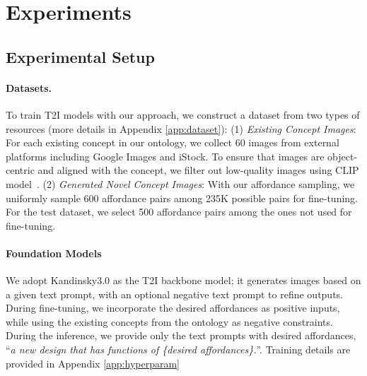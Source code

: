 \section{Experiments}
\label{sec:experiment}
% 




% 

\subsection{Experimental Setup}

\paragraph{Datasets.}
To train T2I models with our approach, we construct a dataset from two types of resources (more details in Appendix \ref{app:dataset}): (1) \textit{Existing Concept Images}: For each existing concept in our ontology, we collect 60 images from external platforms including Google Images and iStock. To ensure that images are object-centric and aligned with the concept, we filter out low-quality images using CLIP model~\citep{radford2021learningtransferablevisualmodels}. (2) \textit{Generated Novel Concept Images}: With our affordance sampling, we uniformly sample 600 affordance pairs among 235K possible pairs for fine-tuning. For the test dataset, we select 500 affordance pairs among the ones not used for fine-tuning.
\paragraph{Foundation Models}
We adopt Kandinsky3.0 \citep{vladimir-etal-2024-kandinsky} as the T2I backbone model; it generates images based on a given text prompt, with an optional negative text prompt to refine outputs. During fine-tuning, we incorporate the desired affordances as positive inputs, while using the existing concepts from the ontology as negative constraints. During the inference, we provide only the text prompts with desired affordances, ``\textit{a new design that has functions of \{desired affordances\}.}''. Training details are provided in Appendix \ref{app:hyperparam}

